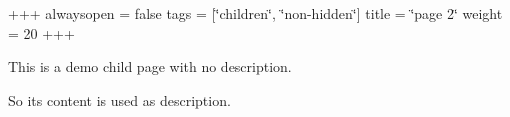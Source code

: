 +++ alwaysopen = false tags = \mbox{[}\char`\"{}children\char`\"{}, \char`\"{}non-\/hidden\char`\"{}\mbox{]} title = \char`\"{}page 2\char`\"{} weight = 20 +++

This is a demo child page with no description.

So its content is used as description. 